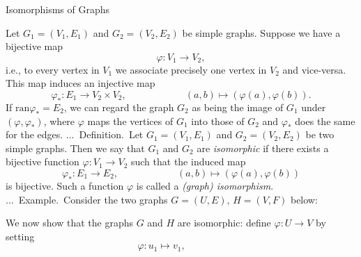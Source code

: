 \documentclass[smaller,hyperref={CJKbookmarks=true}]{beamer}
\newcounter{zhuo}[subsection]
\renewcommand{\thezhuo}{\thesection.\thesubsection.\arabic{zhuo}}
\newenvironment{DEFINITION}{\stepcounter{zhuo}\alert{\thezhuo.~Definition.\,}}{}
\newenvironment{EXAMPLE}{\stepcounter{zhuo}\alert{\!\thezhuo.~Example.\,}}{}
\begin{document}
\begin{frame}{Isomorphisms of Graphs}
\begin{spacing}{1.05}
\vspace*{9pt}
Let $G_1=(V_1,E_1)$ and $G_2=(V_2,E_2)$ be simple graphs. Suppose we have a bijective map
\[\varphi\!:V_1\to V_2,\]
i.e., to every vertex in $V_1$ we associate precisely one vertex in $V_2$ and vice-versa. This map induces an injective map
\[\varphi_\ast\!:E_1\to V_2\times V_2,\qquad\qquad\qquad
(a,b)\mapsto(\varphi(a),\varphi(b)).\]
If $\text{ran}\varphi_\ast=E_2$, we can regard the graph $G_2$ as being the image of $G_1$ under $(\varphi,\varphi_\ast)$, where $\varphi$ maps the vertices of $G_1$ into those of $G_2$ and $\varphi_\ast$ does the same for the edges.
\newpage
\begin{DEFINITION}
Let $G_1=(V_1,E_1)$ and $G_2=(V_2,E_2)$ be two simple graphs. Then we say that $G_1$ and $G_2$ are \emph{isomorphic} if there exists a bijective function $\varphi\!:V_1\to V_2$ such that the induced map
\[\varphi_\ast\!:E_1\to E_2,\qquad\qquad\qquad
(a,b)\mapsto(\varphi(a),\varphi(b))\]
is bijective. Such a function $\varphi$ is called a \emph{(graph) isomorphism}.\\[6pt]
\begin{EXAMPLE}
Consider the two graphs $G=(U,E),\,H=(V,F)$ below:\\[6pt]
\begin{center}
\end{center}
\end{EXAMPLE}
\end{DEFINITION}
\newpage
We now show that the graphs $G$ and $H$ are isomorphic: define $\varphi\!:U\to V$ by setting
\[\varphi\!:u_1\mapsto v_1,\qquad\qquad
\]
\end{spacing}
\end{frame}
\end{document}
